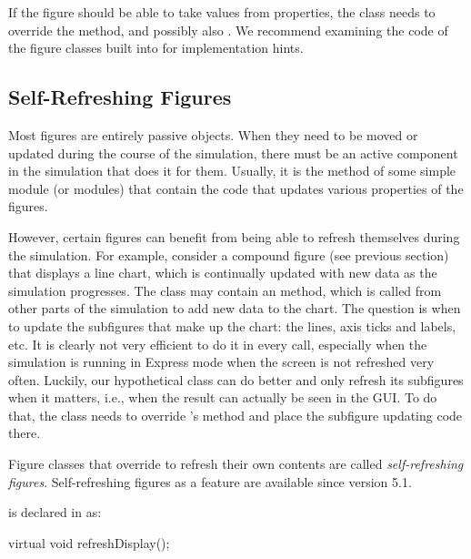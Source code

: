 If the figure should be able to take values from  properties,
the class needs to override the  method,
and possibly also . We recommend
examining the code of the figure classes built into {\opp} for
implementation hints.



\subsection{Self-Refreshing Figures}
\label{sec:graphics:self-refreshing-figures}

Most figures are entirely passive objects. When they need to be moved
or updated during the course of the simulation, there must be an
active component in the simulation that does it for them. Usually, it is the
 method of some simple module (or modules) that
contain the code that updates various properties of the figures.

However, certain figures can benefit from being able to refresh themselves
during the simulation. For example, consider a compound figure (see
previous section) that displays a line chart, which is continually
updated with new data as the simulation progresses. The 
class may contain an  method, which is called
from other parts of the simulation to add new data to the chart.
The question is when to update the subfigures that make up the chart: the
lines, axis ticks and labels, etc. It is clearly not very efficient
to do it in every  call, especially when the
simulation is running in Express mode when the screen is not refreshed
very often. Luckily, our hypothetical  class
can do better and only refresh its subfigures when it matters, i.e.,
when the result can actually be seen in the GUI. To do that, the class
needs to override 's  method and
place the subfigure updating code there.

Figure classes that override  to refresh their
own contents are called \textit{self-refreshing figures}. Self-refreshing
figures as a feature are available since {\opp} version 5.1.

 is declared in  as:

\begin{cpp}
virtual void refreshDisplay();
\end{cpp}

